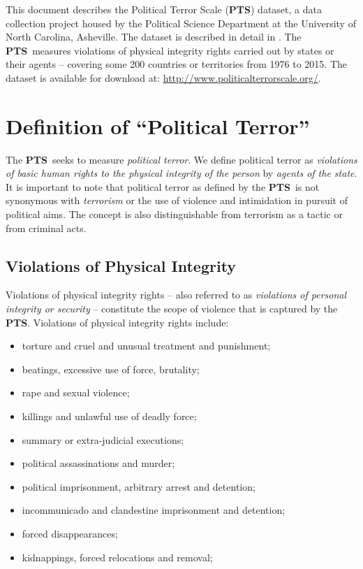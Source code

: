 \documentclass[11pt]{report}
\newcommand{\PTS}{\textsf{\textbf{PTS}}}
\begin{document}
This document describes the Political Terror Scale (\PTS) dataset, a data collection project housed by the Political Science Department at the University of North Carolina, Asheville. The dataset is described in detail in \citet{WoodGibney2010}. The \PTS~measures violations of physical integrity rights carried out by states or their agents -- covering some 200 countries or territories from 1976 to 2015. The dataset is available for download at: \href{http://www.politicalterrorscale.org/}{http://www.politicalterrorscale.org/}.

\section*{Definition of ``Political Terror''}

The \PTS~seeks to measure \textit{political terror}. We define political terror as \textit{violations of basic human rights to the physical integrity of the person} by \textit{agents of the state}. It is important to note that political terror as defined by the \PTS~is not synonymous with \textit{terrorism} or the use of violence and intimidation in pursuit of political aims. The concept is also distinguishable from terrorism as a tactic or from criminal acts.

\subsection*{Violations of Physical Integrity}

Violations of physical integrity rights -- also referred to as \textit{violations of personal integrity or security} -- constitute the scope of violence that is captured by the \PTS. Violations of physical integrity rights include:

\begin{itemize}
  \item torture and cruel and unusual treatment and punishment;
  \item beatings, excessive use of force, brutality;
  \item rape and sexual violence;
  \item killings and unlawful use of deadly force;
  \item summary or extra-judicial executions;
  \item political assassinations and murder;
  \item political imprisonment, arbitrary arrest and detention;
  \item incommunicado and clandestine imprisonment and detention;
  \item forced disappearances;
  \item kidnappings, forced relocations and removal;
\end{itemize}
\end{document}
